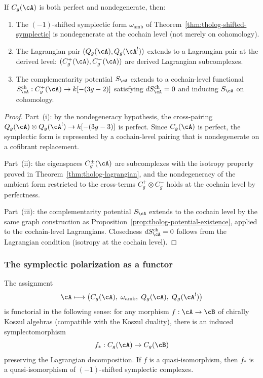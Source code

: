 \begin{theorem}
If $C_g(\cA)$ is both perfect and nondegenerate, then:
\begin{enumerate}[label=\textup{(\roman*)}]
\item The $(-1)$-shifted symplectic form $\omega_{\mathrm{amb}}$
 of Theorem~\ref{thm:tholog-shifted-symplectic} is
 nondegenerate at the cochain level (not merely on cohomology).
\item The Lagrangian pair $(Q_g(\cA), Q_g(\cA^!))$ extends
 to a Lagrangian pair at the derived level:
 $(C_g^+(\cA), C_g^-(\cA))$ are derived Lagrangian
 subcomplexes.
\item The complementarity potential $S_\cA$ extends to a
 cochain-level functional
 $S_\cA^{\mathrm{ch}} : C_g^+(\cA) \to k[-(3g-2)]$
 satisfying $dS_\cA^{\mathrm{ch}} = 0$ and inducing
 $S_\cA$ on cohomology.
\end{enumerate}
\end{theorem}

\begin{proof}
Part~(i): by the nondegeneracy hypothesis, the cross-pairing
$Q_g(\cA) \otimes Q_g(\cA^!) \to k[-(3g-3)]$ is perfect.
Since $C_g(\cA)$ is perfect, the symplectic form is
represented by a cochain-level pairing that is nondegenerate
on a cofibrant replacement.

Part~(ii): the eigenspaces $C_g^\pm(\cA)$ are subcomplexes
with the isotropy property proved in
Theorem~\ref{thm:tholog-lagrangian}, and the nondegeneracy
of the ambient form restricted to the cross-terms
$C_g^+ \otimes C_g^-$ holds at the cochain level by
perfectness.

Part~(iii): the complementarity potential
$S_\cA$ extends to the cochain level by the same graph
construction as Proposition~\ref{prop:tholog-potential-existence},
applied to the cochain-level Lagrangians.
Closedness $dS_\cA^{\mathrm{ch}} = 0$ follows from the
Lagrangian condition (isotropy at the cochain level).
\end{proof}

\subsubsection{The symplectic polarization as a functor}

\begin{proposition}[Functoriality]
The assignment
\[
\cA \longmapsto
\bigl(C_g(\cA),\; \omega_{\mathrm{amb}},\;
Q_g(\cA),\; Q_g(\cA^!)\bigr)
\]
is functorial in the following sense:
for any morphism $f : \cA \to \cB$ of chirally Koszul
algebras (compatible with the Koszul duality), there is an
induced symplectomorphism
\[
f_* : C_g(\cA) \to C_g(\cB)
\]
preserving the Lagrangian decomposition.
If $f$ is a quasi-isomorphism, then $f_*$ is a
quasi-isomorphism of $(-1)$-shifted symplectic complexes.
\end{proposition}

